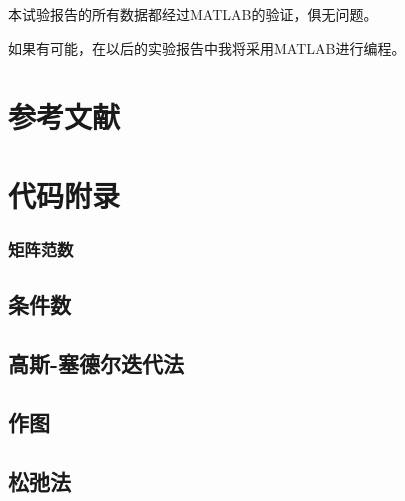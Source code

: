 本试验报告的所有数据都经过MATLAB的验证，俱无问题。

如果有可能，在以后的实验报告中我将采用MATLAB进行编程。

\section{参考文献}

\printbibliography[heading=none]


\section{代码附录}
\label{附录}

\subsubsection{矩阵范数}


\subsection{条件数}


\subsection{高斯-塞德尔迭代法}


\subsection{作图}


\subsection{松弛法}



